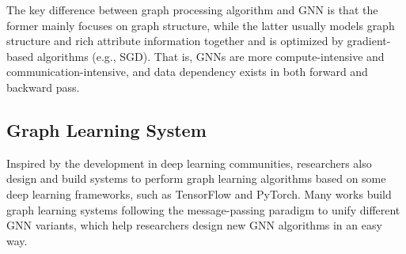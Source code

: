 \documentclass[conference]{IEEEtran}
\begin{document}


The key difference between graph processing algorithm and GNN is that the former mainly focuses on graph structure, while the latter usually models graph structure and rich attribute information together and is optimized by gradient-based algorithms (e.g., SGD\cite{b32}).
That is, GNNs are more compute-intensive and communication-intensive, and data dependency exists in both forward and backward pass.

\subsection{Graph Learning System} 
\label{sec:gl_system}
Inspired by the development in deep learning communities, researchers also design and build systems to perform graph learning algorithms based on some deep learning frameworks, such as TensorFlow\cite{b33} and PyTorch\cite{b34}.
Many works\cite{b13,b14,b15,b16,b17} build graph learning systems following the message-passing paradigm to unify different GNN variants, which 
help researchers design new GNN algorithms in an easy way.  
\end{document}
